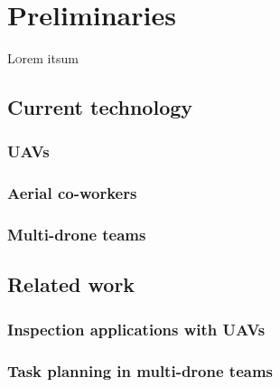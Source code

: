 \chapter{Preliminaries}
\label{ch:Preliminaries}
\lettrine[lraise=-0.1, lines=2, loversize=0.2]{L}{o}rem itsum

\section{Current technology}
\label{sec:CurrentTechnology}

\subsection{UAVs}
\label{subsec:UAVs}

\subsection{Aerial co-workers}
\label{subsec:AerialCo-workers}

\subsection{Multi-drone teams}
\label{subsec:Multi-droneTeams}


\section{Related work}
\label{sec:RelatedWork}

\subsection{Inspection applications with UAVs}
\label{subsec:InspectionApplicationsWithUAVs}

\subsection{Task planning in multi-drone teams}
\label{subsec:TaskPlanning}

